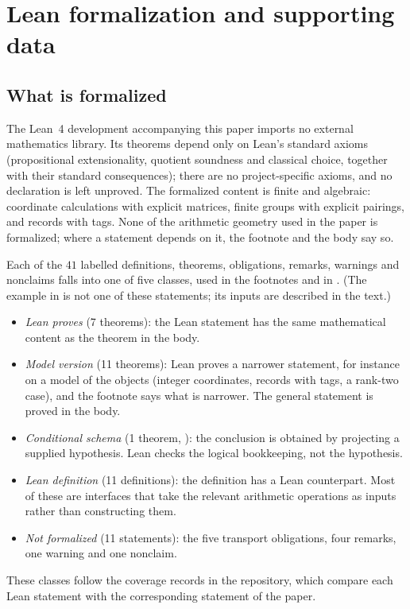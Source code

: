\section{Lean formalization and supporting data}\label{app:formalization}

\subsection*{What is formalized}

The Lean~4 development accompanying this paper imports no external
mathematics library.  Its theorems depend only on Lean's standard axioms
(propositional extensionality, quotient soundness and classical choice,
together with their standard consequences); there are no project-specific
axioms, and no declaration is left unproved.  The formalized content is
finite and algebraic: coordinate calculations with explicit matrices,
finite groups with explicit pairings, and records with tags.  None of the
arithmetic geometry used in the paper is formalized; where a statement
depends on it, the footnote and the body say so.

Each of the $41$ labelled definitions, theorems, obligations, remarks,
warnings and nonclaims falls into one of five classes, used in the
footnotes and in .  (The example in
 is not one of these statements; its inputs are
described in the text.)
\begin{itemize}
\item \emph{Lean proves} (7 theorems): the Lean statement has the same
  mathematical content as the theorem in the body.
\item \emph{Model version} (11 theorems): Lean proves a narrower statement,
  for instance on a model of the objects (integer coordinates, records
  with tags, a rank-two case), and the footnote says what is narrower.  The
  general statement is proved in the body.
\item \emph{Conditional schema} (1 theorem, ):
  the conclusion is obtained by projecting a supplied hypothesis.  Lean
  checks the logical bookkeeping, not the hypothesis.
\item \emph{Lean definition} (11 definitions): the definition has a Lean
  counterpart.  Most of these are interfaces that take the relevant
  arithmetic operations as inputs rather than constructing them.
\item \emph{Not formalized} (11 statements): the five transport
  obligations, four remarks, one warning and one nonclaim.
\end{itemize}
These classes follow the coverage records in the repository, which compare
each Lean statement with the corresponding statement of the paper.

